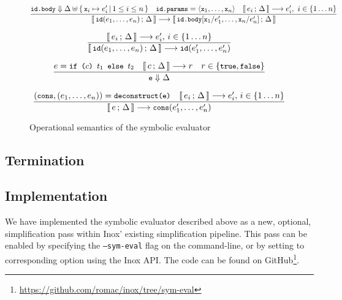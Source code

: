 \documentclass[a4paper,twoside]{article}
\newcommand{\lb}[2]{\llbracket\, #1\,;\, #2\, \rrbracket}
\newcommand{\stt}[1]{\texttt{\small{#1}}}
\begin{document}
\begin{landscape}
\begin{figure}[htb]
\begin{framed}
\begin{equation}
\dfrac{
 \stt{id.body} \Downarrow \Delta \uplus \{\,\stt{x}_i \mapsto e_i'\,|\, 1 \leq i \leq n\,\}
 \quad
 \stt{id.params} = \langle \stt{x}_1, \ldots, \stt{x}_n \rangle
 \quad
 \lb{e_i}{\Delta} \longrightarrow e_i',\  i \in \{1 \ldots n\}
}{
  \lb{\stt{id}(e_1,\ldots,e_n)}{\Delta} \longrightarrow
  \lb{\stt{id.body}[\stt{x}_1/e_1',\ldots,\stt{x}_n/e_n']}{\Delta}
}
\label{fig:symbolicsem:fi2}
\end{equation}

\begin{equation}
\dfrac{
 \lb{e_i}{\Delta} \longrightarrow e_i',\, i \in \{1 \ldots n\}
}{
  \lb{\stt{id}(e_1,\ldots,e_n)}{\Delta} \longrightarrow
  \stt{id}(e_1',\ldots,e_n')
}
\label{fig:symbolicsem:fi3}
\end{equation}

\begin{equation}
\dfrac{
 e = \stt{if ($c$) $t_1$ else $t_2$} \quad
 \lb{c}{\Delta} \longrightarrow r \quad
 r \in \{\stt{true}, \stt{false}\}
}{
  \stt{e} \Downarrow \Delta
}
\end{equation}

\begin{equation}
\dfrac{
  (\stt{cons}, (e_1, \ldots, e_n)) = \stt{deconstruct(e)} \quad
  \lb{e_i}{\Delta} \longrightarrow e_i',\, i \in \{1 \ldots n\}
}{
  \lb{e}{\Delta} \longrightarrow \stt{cons}(e_1', \ldots, e_n')
}
\end{equation}

\end{framed}
\vspace{-10pt}
\caption{Operational semantics of the symbolic evaluator \label{fig:symbolicsem}}
\end{figure}
\end{landscape}

\subsection{Termination}



\subsection{Implementation}

We have implemented the symbolic evaluator described above as a new, optional, simplification pass within Inox' existing simplification pipeline. This pass can be enabled by specifying the \texttt{---sym-eval} flag on the command-line, or by setting to corresponding option using the Inox API. The code can be found on GitHub\footnote{\url{https://github.com/romac/inox/tree/sym-eval}}.
\end{document}
